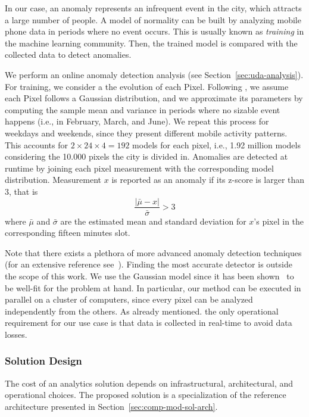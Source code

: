 {In our case, an anomaly represents an infrequent event in the city, which attracts a large number of people. A model of normality can be built by analyzing mobile phone data in periods where no event occurs. This is usually known as \textit{training} in the machine learning community. Then, the trained model is compared with the collected data to detect anomalies.

We perform an online anomaly detection analysis (see Section~\ref{sec:uda-analysis}). 
For training, we consider a the evolution of each \textsf{Pixel}. 
Following \cite{DBLP:journals/ieeemm/BalduiniVALAC15}, we assume each \textsf{Pixel} follows a Gaussian distribution, and we approximate its parameters by computing the sample mean and variance in periods where no sizable event happens (i.e., in February, March, and June). We repeat this process for weekdays and weekends, since they present different mobile activity patterns. This accounts for $2 \times 24 \times 4 = 192$ models for each pixel, i.e., 1.92 million models considering the 10.000 pixels the city is divided in. Anomalies are detected at runtime by joining each pixel measurement with the corresponding model distribution. Measurement $x$ is reported as an anomaly if its z-score is larger than $3$, that is 
\begin{equation}
\label{eq:zscore}
  \frac{|\bar{\mu} - x|}{\bar{\sigma}} > 3
\end{equation}
where $\bar{\mu}$ and $\bar{\sigma}$ are the estimated mean and standard deviation for $x$'s pixel in the corresponding fifteen minutes slot.

Note that there exists a plethora of more advanced anomaly detection techniques (for an extensive reference see~\cite{aggarwal2015outlier}). Finding the most accurate detector is outside the scope of this work. We use the Gaussian model since it has been shown~\cite{DBLP:journals/ieeemm/BalduiniVALAC15} to be well-fit for the problem at hand. In particular, our method can be executed in parallel on a cluster of computers, since every pixel can be analyzed independently from the others. As already mentioned. the only operational requirement for our use case is that data is collected in real-time to avoid data losses.

\subsubsection{Solution Design} \label{sec:solutions}
The cost of an analytics solution depends on infrastructural, architectural, and operational choices. The proposed solution is a specialization of the reference architecture presented in Section~\ref{sec:comp-mod-sol-arch}.

}
